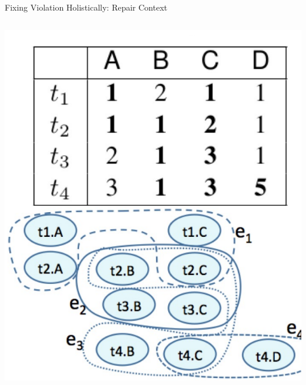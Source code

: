 \documentclass[aspectratio=169]{../latex_main/tntbeamer}  %
\begin{document}
\begin{frame}[c]{Fixing Violation Holistically: Repair Context}
\begin{columns}
        \centering\includegraphics[width=.8\textwidth]{figure/bild22_graphs2}
    
    \end{columns}


\end{frame}
\end{document}
